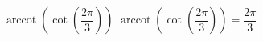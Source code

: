  {$\operatorname{arccot}\left(\cot\left(\dfrac{2\pi}{3}\right) \right)$ }
{ $\operatorname{arccot}\left(\cot\left(\dfrac{2\pi}{3}\right) \right) = \dfrac{2\pi}{3}$}
